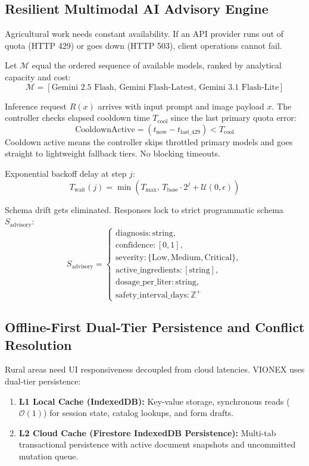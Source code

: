 \documentclass[conference]{IEEEtran}
\begin{document}
\subsection{Resilient Multimodal AI Advisory Engine}
Agricultural work needs constant availability. If an API provider runs out of quota (HTTP 429) or goes down (HTTP 503), client operations cannot fail.

Let $\mathcal{M}$ equal the ordered sequence of available models, ranked by analytical capacity and cost:
\begin{equation}
\mathcal{M} = \left[ \text{Gemini 2.5 Flash},\, \text{Gemini Flash-Latest},\, \text{Gemini 3.1 Flash-Lite} \right]
\end{equation}

Inference request $R(x)$ arrives with input prompt and image payload $x$. The controller checks elapsed cooldown time $T_{\text{cool}}$ since the last primary quota error:
\begin{equation}
\text{CooldownActive} = (t_{\text{now}} - t_{\text{last\_429}}) < T_{\text{cool}}
\end{equation}
Cooldown active means the controller skips throttled primary models and goes straight to lightweight fallback tiers. No blocking timeouts.

Exponential backoff delay at step $j$:
\begin{equation}
T_{\text{wait}}(j) = \min\left(T_{\text{max}},\, T_{\text{base}} \cdot 2^j + \mathcal{U}(0, \epsilon)\right)
\end{equation}

Schema drift gets eliminated. Responses lock to strict programmatic schema $S_{\text{advisory}}$:
\begin{equation}
S_{\text{advisory}} = \begin{cases} 
\text{diagnosis}: \text{string}, \\
\text{confidence}: [0, 1], \\
\text{severity}: \{\text{Low}, \text{Medium}, \text{Critical}\}, \\
\text{active\_ingredients}: [\text{string}], \\
\text{dosage\_per\_liter}: \text{string}, \\
\text{safety\_interval\_days}: \mathbb{Z}^+
\end{cases}
\end{equation}

\subsection{Offline-First Dual-Tier Persistence and Conflict Resolution}
Rural areas need UI responsiveness decoupled from cloud latencies. VIONEX uses dual-tier persistence:
\begin{enumerate}
    \item \textbf{L1 Local Cache (IndexedDB):} Key-value storage, synchronous reads ($\mathcal{O}(1)$) for session state, catalog lookups, and form drafts.
    \item \textbf{L2 Cloud Cache (Firestore IndexedDB Persistence):} Multi-tab transactional persistence with active document snapshots and uncommitted mutation queue.
\end{enumerate}
\end{document}

